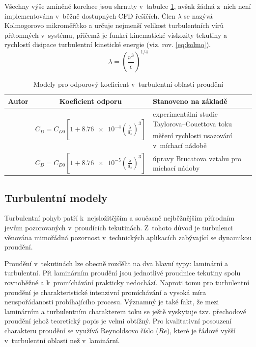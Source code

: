 Všechny výše zmíněné korelace jsou shrnuty v~tabulce \ref{tab:cds}, avšak žádná z~nich není implementována v~běžně dostupných CFD řešičích. Člen $\lambda$ se nazývá Kolmogorovo mikroměřítko a určuje nejmenší velikost turbulentních vírů přítomných v~systému, přičemž je funkcí kinematické viskozity tekutiny a rychlostí disipace turbulentní kinetické energie (viz. rov. \ref{eq:kolmo}).
\begin{equation}
  \lambda = \left( \frac{\nu^{3}}{\epsilon} \right) ^{1/4}
	\label{eq:kolmo}
\end{equation}

\begin{table}[h!]
\centering
\caption{Modely pro odporový koeficient v~turbulentní oblasti proudění}
\label{tab:cds}
\begin{tabular}{cc>{\centering\arraybackslash}p{5cm}}
\toprule
\textbf{Autor} & \textbf{Koeficient odporu} & \textbf{Stanoveno na základě} \\
\midrule{}

\multirow{2}{*}{\citet{bru98}} & \multirow{2}{*}{$C_{D} = C_{D0} \left[ 1 + \num{8.76e-4} \left( \frac{\lambda}{d_{s}} \right)^{3} \right] $} & experimentální studie Taylorova–Couettova toku \\ \addlinespace

\multirow{2}{*}{\citet{pin01}} & \multirow{2}{*}{$C_{D} = C_{D0} \left[ \num{0.4}\tanh\left(  \frac{16\lambda}{d_{s}} - 1  \right) \right] ^{-2}$} & měření rychlosti usazování v~míchací nádobě \\ \addlinespace

\multirow{2}{*}{\citet{kho06}} & \multirow{2}{*}{$C_{D} = C_{D0} \left[ 1 + \num{8.76e-5} \left( \frac{\lambda}{d_{s}} \right)^{3} \right]$} & úpravy Brucatova vztahu pro míchací nádoby  \\

\bottomrule
\end{tabular}
\end{table}

\subsection{Turbulentní modely}
Turbulentní pohyb patří k~nejsložitějším a současně nejběžnějším přírodním jevům pozorovaných v~proudících tekutinách. Z~tohoto důvod je turbulenci věnována mimořádná pozornost v~technických aplikacích zabývající se dynamikou proudění. 

Proudění v~tekutinách lze obecně rozdělit na dva hlavní typy: laminární a turbulentní. Při laminárním proudění jsou jednotlivé proudnice tekutiny spolu rovnoběžné a k~promíchávání prakticky nedochází. Naproti tomu pro turbulentní proudění je charakteristické intenzivní promíchávání a vysoká míra neuspořádanosti probíhajícího procesu. Významný je také fakt, že mezi laminárním a turbulentním charakterem toku se ještě vyskytuje tzv. přechodové proudění jehož teoretický popis je velmi obtížný. Pro kvalitativní posouzení charakteru proudění se využívá Reynoldsovo číslo ($Re$), které je řádově vyšší v~turbulentní oblasti než v~laminární. 


